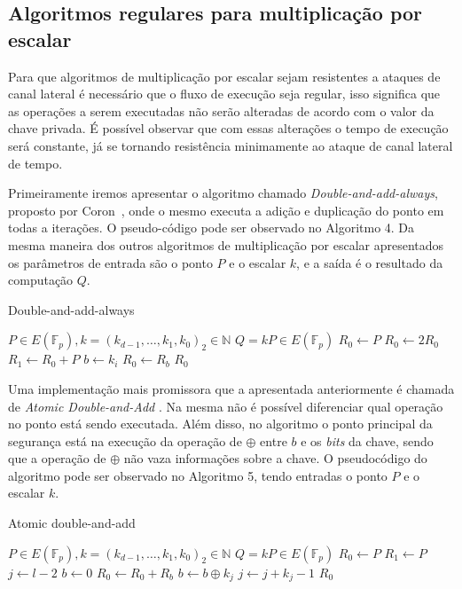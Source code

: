 \subsection{Algoritmos regulares para multiplicação por escalar}
Para que algoritmos de multiplicação por escalar sejam resistentes a ataques de canal lateral é necessário que o fluxo de execução seja regular, isso significa que as operações a serem executadas não serão alteradas de acordo com o valor da chave privada. É possível observar que com essas alterações o tempo de execução será constante, já se tornando resistência minimamente ao ataque de canal lateral de tempo.

Primeiramente iremos apresentar o algoritmo chamado \textit{Double-and-add-always}, proposto por Coron~\cite{Coron1999}, onde o mesmo executa a adição e duplicação do ponto em todas a iterações. O pseudo-código pode ser observado no Algoritmo 4. Da mesma maneira dos outros algoritmos de multiplicação por escalar apresentados os parâmetros de entrada são o ponto $P$ e o escalar $k$, e a saída é o resultado da computação $Q$.

\begin{algorithm}[H]
\caption{Double-and-add-always}
\begin{algorithmic} 
    \REQUIRE $P \in E(\mathbb{F}_p), k=(k_{d-1},\ldots,k_1,k_0)_2 \in \mathbb{N}$
    \ENSURE $Q = kP \in E(\mathbb{F}_p)$
    \STATE $R_0 \leftarrow P$
        \STATE $R_0 \leftarrow 2R_0$
        \STATE $R_1 \leftarrow R_0 + P$
        \STATE $b \leftarrow k_{i}$
        \STATE $R_0 \leftarrow R_b$
    \ENDFOR
    \RETURN $R_0$
    \end{algorithmic}
\end{algorithm}

Uma implementação mais promissora que a apresentada anteriormente é chamada de \textit{Atomic Double-and-Add} \cite{BatinaChmielewski2014}. Na mesma não é possível diferenciar qual operação no ponto está sendo executada. Além disso, no algoritmo o ponto principal da segurança está na execução da operação de $\oplus$ entre $b$ e os \textit{bits} da chave, sendo que a operação de $\oplus$ não vaza informações sobre a chave. O pseudocódigo do algoritmo pode ser observado no Algoritmo 5, tendo entradas o ponto $P$ e o escalar $k$.

\begin{algorithm}[H]
\caption{Atomic double-and-add}
\begin{algorithmic} 
    \REQUIRE $P \in E(\mathbb{F}_p), k=(k_{d-1},\ldots,k_1,k_0)_2 \in \mathbb{N}$
    \ENSURE $Q = kP \in E(\mathbb{F}_p)$
    \STATE $R_0 \leftarrow P$
    \STATE $R_1 \leftarrow P$
    \STATE $j \leftarrow l - 2$
    \STATE $b \leftarrow 0$
        \STATE $R_0 \leftarrow R_0 + R_b$
        \STATE $b \leftarrow b \oplus k_j$
        \STATE $j \leftarrow j + k_j -1$
    \ENDWHILE
    \RETURN $R_0$
    \end{algorithmic}
\end{algorithm}


